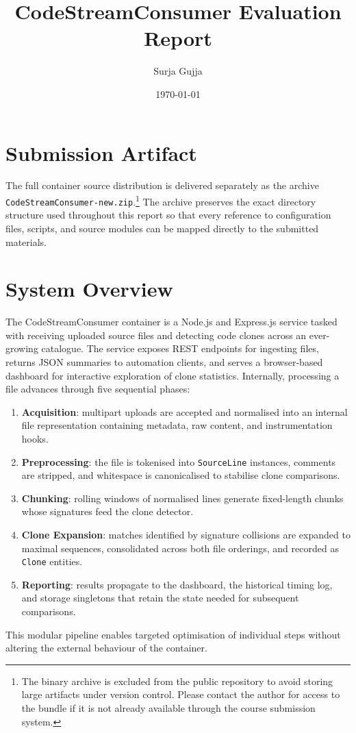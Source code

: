 \documentclass[11pt]{article}
\title{CodeStreamConsumer Evaluation Report}
\author{Surja Gujja}
\date{\today}
\begin{document}
\maketitle

\section*{Submission Artifact}
The full container source distribution is delivered separately as the archive \texttt{CodeStreamConsumer-new.zip}.\footnote{The binary archive is excluded from the public repository to avoid storing large artifacts under version control. Please contact the author for access to the bundle if it is not already available through the course submission system.}
The archive preserves the exact directory structure used throughout this report so that every reference to configuration files, scripts, and source modules can be mapped directly to the submitted materials.

\section*{System Overview}
The CodeStreamConsumer container is a Node.js and Express.js service tasked with receiving uploaded source files and detecting code clones across an ever-growing catalogue.
The service exposes REST endpoints for ingesting files, returns JSON summaries to automation clients, and serves a browser-based dashboard for interactive exploration of clone statistics.
Internally, processing a file advances through five sequential phases:
\begin{enumerate}[label=\textbf{\arabic*.}]
  \item \textbf{Acquisition}: multipart uploads are accepted and normalised into an internal file representation containing metadata, raw content, and instrumentation hooks.
  \item \textbf{Preprocessing}: the file is tokenised into \texttt{SourceLine} instances, comments are stripped, and whitespace is canonicalised to stabilise clone comparisons.
  \item \textbf{Chunking}: rolling windows of normalised lines generate fixed-length chunks whose signatures feed the clone detector.
  \item \textbf{Clone Expansion}: matches identified by signature collisions are expanded to maximal sequences, consolidated across both file orderings, and recorded as \texttt{Clone} entities.
  \item \textbf{Reporting}: results propagate to the dashboard, the historical timing log, and storage singletons that retain the state needed for subsequent comparisons.
\end{enumerate}
This modular pipeline enables targeted optimisation of individual steps without altering the external behaviour of the container.
\end{document}
